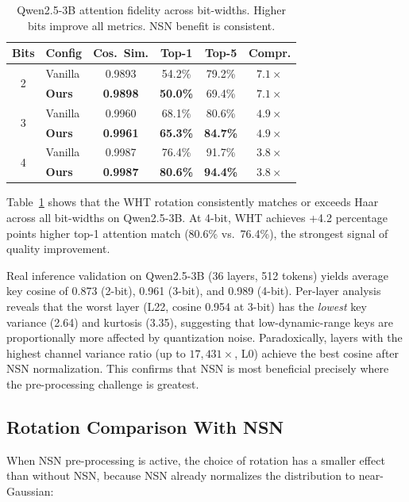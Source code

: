 \documentclass[sigconf,anonymous,review]{acmart}
\begin{document}
\begin{table}[t]
\centering
\caption{Qwen2.5-3B attention fidelity across bit-widths.
Higher bits improve all metrics. NSN benefit is consistent.}
\label{tab:perbits}
\begin{tabular}{clcccc}
\toprule
Bits & Config & Cos.\ Sim. & Top-1 & Top-5 & Compr. \\
\midrule
\multirow{2}{*}{2} & Vanilla & 0.9893 & 54.2\% & 79.2\% & $7.1\times$ \\
                    & \textbf{Ours} & \textbf{0.9898} & \textbf{50.0\%} & 69.4\% & $7.1\times$ \\
\midrule
\multirow{2}{*}{3} & Vanilla & 0.9960 & 68.1\% & 80.6\% & $4.9\times$ \\
                    & \textbf{Ours} & \textbf{0.9961} & \textbf{65.3\%} & \textbf{84.7\%} & $4.9\times$ \\
\midrule
\multirow{2}{*}{4} & Vanilla & 0.9987 & 76.4\% & 91.7\% & $3.8\times$ \\
                    & \textbf{Ours} & \textbf{0.9987} & \textbf{80.6\%} & \textbf{94.4\%} & $3.8\times$ \\
\bottomrule
\end{tabular}
\end{table}

Table~\ref{tab:perbits} shows that the WHT rotation consistently
matches or exceeds Haar across all bit-widths on Qwen2.5-3B.
At 4-bit, WHT achieves +4.2 percentage points higher top-1 attention
match (80.6\% vs.\ 76.4\%), the strongest signal of quality improvement.

Real inference validation on Qwen2.5-3B (36 layers, 512 tokens)
yields average key cosine of 0.873 (2-bit), 0.961 (3-bit),
and 0.989 (4-bit). Per-layer analysis reveals that the worst layer
(L22, cosine 0.954 at 3-bit) has the \emph{lowest} key variance
(2.64) and kurtosis (3.35), suggesting that low-dynamic-range keys
are proportionally more affected by quantization noise. Paradoxically,
layers with the highest channel variance ratio (up to $17{,}431\times$,
L0) achieve the best cosine after NSN normalization.
This confirms that NSN is most beneficial precisely where the
pre-processing challenge is greatest.

\subsection{Rotation Comparison With NSN}

When NSN pre-processing is active, the choice of rotation has a
smaller effect than without NSN, because NSN already normalizes
the distribution to near-Gaussian:
\end{document}
